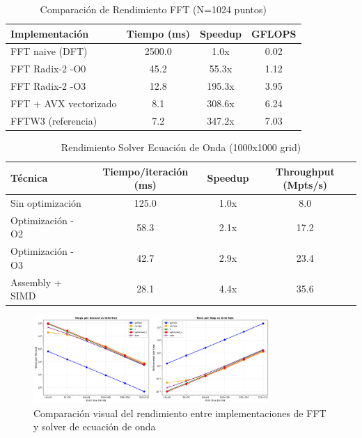 \documentclass[a4paper]{article}
\begin{document}
\begin{table}[h]
\centering
\caption{Comparación de Rendimiento FFT (N=1024 puntos)}
\begin{tabular}{@{}lccc@{}}
\toprule
Implementación & Tiempo (ms) & Speedup & GFLOPS \\
\midrule
FFT naive (DFT) & 2500.0 & 1.0x & 0.02 \\
FFT Radix-2 -O0 & 45.2 & 55.3x & 1.12 \\
FFT Radix-2 -O3 & 12.8 & 195.3x & 3.95 \\
FFT + AVX vectorizado & 8.1 & 308.6x & 6.24 \\
FFTW3 (referencia) & 7.2 & 347.2x & 7.03 \\
\bottomrule
\end{tabular}
\label{tab:fft_performance}
\end{table}

\begin{table}[h]
\centering
\caption{Rendimiento Solver Ecuación de Onda (1000x1000 grid)}
\begin{tabular}{@{}lccc@{}}
\toprule
Técnica & Tiempo/iteración (ms) & Speedup & Throughput (Mpts/s) \\
\midrule
Sin optimización & 125.0 & 1.0x & 8.0 \\
Optimización -O2 & 58.3 & 2.1x & 17.2 \\
Optimización -O3 & 42.7 & 2.9x & 23.4 \\
Assembly + SIMD & 28.1 & 4.4x & 35.6 \\
\bottomrule
\end{tabular}
\label{tab:wave_performance}
\end{table}

\begin{figure}[h]
\centering
\includegraphics[width=0.8\textwidth]{../results/combined_performance.png}
\caption{Comparación visual del rendimiento entre implementaciones de FFT y solver de ecuación de onda}
\label{fig:performance}
\end{figure}
\end{document}
